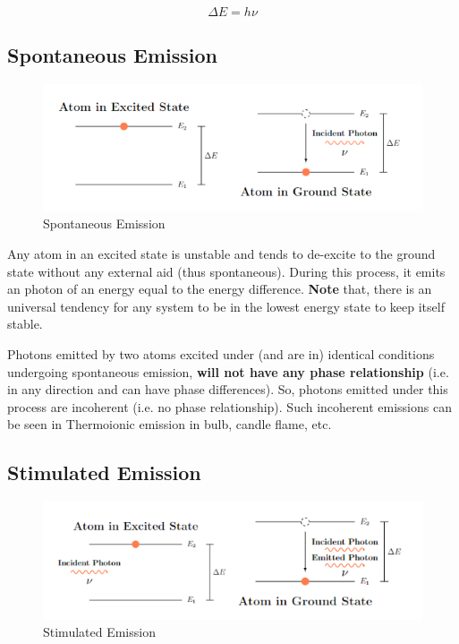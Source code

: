 \documentclass[12pt]{article}
\begin{document}
\begin{equation}
    \Delta E = h\nu
\end{equation}

\subsection{Spontaneous Emission}

\begin{figure}[H]
    \centering
    \includegraphics[scale=0.5]{./img/04_spontaneous_emission.png}
    \caption{Spontaneous Emission}
\end{figure}

Any atom in an excited state is unstable and tends to de-excite to the ground state without any external aid (thus spontaneous). During this process, it emits an photon of an energy equal to the energy difference. \textbf{Note} that, there is an universal tendency for any system to be in the lowest energy state to keep itself stable.

Photons emitted by two atoms excited under (and are in) identical conditions undergoing spontaneous emission, \textbf{will not have any phase relationship} (i.e. in any direction and can have phase differences). So, photons emitted under this process are incoherent (i.e. no phase relationship). Such incoherent emissions can be seen in Thermoionic emission in bulb, candle flame, etc.

\subsection{Stimulated Emission}

\begin{figure}[H]
    \centering
    \includegraphics[scale=0.5]{./img/05_stimulated_emission.png}
    \caption{Stimulated Emission}
\end{figure}
\end{document}
